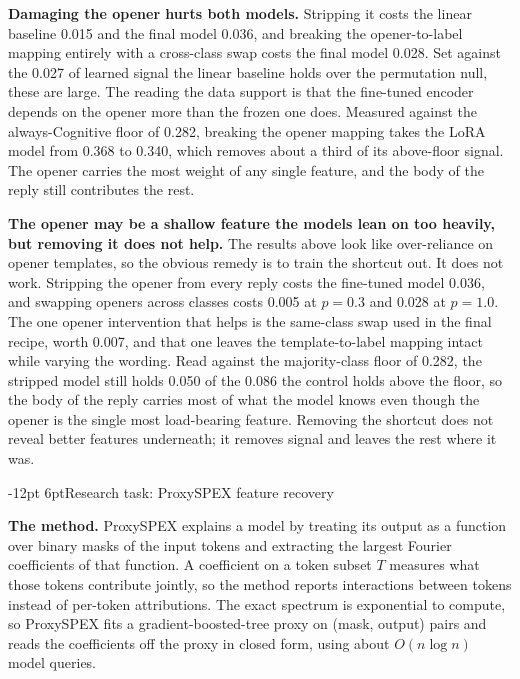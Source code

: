 \documentclass[11pt,a4paper]{article}
\makeatletter
\renewcommand\section{\@startsection{section}{1}{\z@}%
  {-12pt \@plus -3pt \@minus -2pt}{6pt}{\normalfont\large\bfseries}}
\makeatother
\begin{document}
\textbf{Damaging the opener hurts both models.} Stripping it costs the linear baseline
0.015 and the final model 0.036, and breaking the opener-to-label mapping entirely with a
cross-class swap costs the final model 0.028. Set against the 0.027 of learned signal the
linear baseline holds over the permutation null, these are large. The reading the data
support is that the fine-tuned encoder depends on the opener more than the frozen one does.
Measured against the always-Cognitive floor of 0.282, breaking the opener mapping
takes the LoRA model from 0.368 to 0.340, which removes about a third of its above-floor
signal. The opener carries the most weight of any single feature, and the body of the reply
still contributes the rest.

\textbf{The opener may be a shallow feature the models lean on too heavily, but removing it
does not help.}
The results above look like over-reliance on opener templates, so the obvious remedy is to
train the shortcut out. It does not work. Stripping the opener from
every reply costs the fine-tuned model 0.036, and swapping openers across classes costs
0.005 at $p=0.3$ and 0.028 at $p=1.0$. The one opener intervention that helps is the
same-class swap used in the final recipe, worth 0.007, and that one leaves the
template-to-label mapping intact while varying the wording. Read against the
majority-class floor of 0.282, the stripped model still holds 0.050 of the 0.086 the control
holds above the floor, so the body of the reply carries most of what the model knows even
though the opener is the single most load-bearing feature. Removing the shortcut does not
reveal better features underneath; it removes signal and leaves the rest where it was.

\section{Research task: ProxySPEX feature recovery}

\textbf{The method.} ProxySPEX \cite{proxyspex} explains a model by treating its output as
a function over binary masks of the input tokens and extracting the largest Fourier
coefficients of that function. A coefficient on a token subset $T$ measures what those
tokens contribute jointly, so the method reports interactions between tokens instead of
per-token attributions. The exact spectrum is exponential to compute, so ProxySPEX fits a
gradient-boosted-tree proxy on (mask, output) pairs and reads the coefficients off the
proxy in closed form, using about $O(n \log n)$ model queries.
\end{document}

